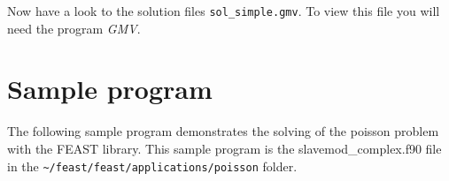 Now have a look to the solution files \verb+sol_simple.gmv+. To
view this file you will need the program {\em GMV}.


\section{Sample program}

The following sample program demonstrates the solving of the poisson problem
with the FEAST library. This sample program is the slavemod\_complex.f90 file
in the \verb+~/feast/feast/applications/poisson+ folder.




